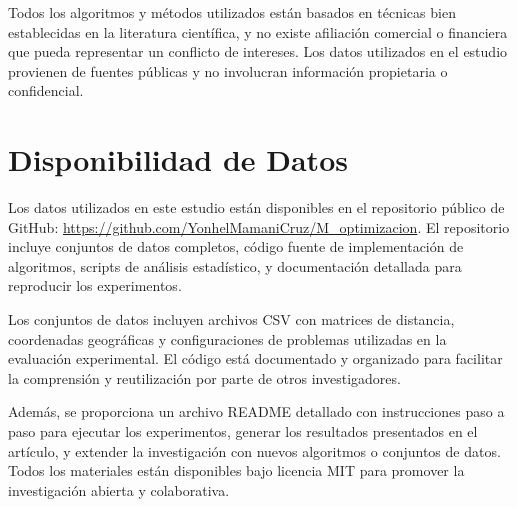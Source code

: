 \documentclass[12pt,a4paper]{article}
\begin{document}
Todos los algoritmos y métodos utilizados están basados en técnicas bien establecidas en la literatura científica, y no existe afiliación comercial o financiera que pueda representar un conflicto de intereses. Los datos utilizados en el estudio provienen de fuentes públicas y no involucran información propietaria o confidencial.

\section{Disponibilidad de Datos}

Los datos utilizados en este estudio están disponibles en el repositorio público de GitHub: \url{https://github.com/YonhelMamaniCruz/M_optimizacion}. El repositorio incluye conjuntos de datos completos, código fuente de implementación de algoritmos, scripts de análisis estadístico, y documentación detallada para reproducir los experimentos.

Los conjuntos de datos incluyen archivos CSV con matrices de distancia, coordenadas geográficas y configuraciones de problemas utilizadas en la evaluación experimental. El código está documentado y organizado para facilitar la comprensión y reutilización por parte de otros investigadores.

Además, se proporciona un archivo README detallado con instrucciones paso a paso para ejecutar los experimentos, generar los resultados presentados en el artículo, y extender la investigación con nuevos algoritmos o conjuntos de datos. Todos los materiales están disponibles bajo licencia MIT para promover la investigación abierta y colaborativa.

\section{}
\end{document}
